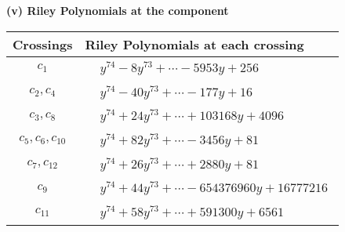 \documentclass[1p]{elsarticle_modified}
\theoremstyle{definition}
\begin{document}
\flushleft \textbf{(v) Riley Polynomials at the component}\newline \\
\begin{tabular}{m{50pt}|m{274pt}}
Crossings & \hspace{64pt}Riley Polynomials at each crossing \\
\hline $$\begin{aligned}c_{1}\end{aligned}$$&$\begin{aligned}
&y^{74}-8 y^{73}+\cdots-5953 y+256
\end{aligned}$\\
\hline $$\begin{aligned}c_{2},c_{4}\end{aligned}$$&$\begin{aligned}
&y^{74}-40 y^{73}+\cdots-177 y+16
\end{aligned}$\\
\hline $$\begin{aligned}c_{3},c_{8}\end{aligned}$$&$\begin{aligned}
&y^{74}+24 y^{73}+\cdots+103168 y+4096
\end{aligned}$\\
\hline $$\begin{aligned}c_{5},c_{6},c_{10}\end{aligned}$$&$\begin{aligned}
&y^{74}+82 y^{73}+\cdots-3456 y+81
\end{aligned}$\\
\hline $$\begin{aligned}c_{7},c_{12}\end{aligned}$$&$\begin{aligned}
&y^{74}+26 y^{73}+\cdots+2880 y+81
\end{aligned}$\\
\hline $$\begin{aligned}c_{9}\end{aligned}$$&$\begin{aligned}
&y^{74}+44 y^{73}+\cdots-654376960 y+16777216
\end{aligned}$\\
\hline $$\begin{aligned}c_{11}\end{aligned}$$&$\begin{aligned}
&y^{74}+58 y^{73}+\cdots+591300 y+6561
\end{aligned}$\\
\hline
\end{tabular}\\~\\
\end{document}
